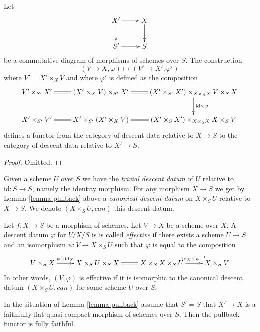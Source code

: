 \begin{lemma}
\label{lemma-pullback}
Let
$$
\xymatrix{
X' \ar[r] \ar[d] & X \ar[d] \\
S' \ar[r] & S
}
$$
be a commutative diagram of morphisms of schemes over $S$.
The construction
$$
(V \to X, \varphi) \longmapsto (V' \to X', \varphi')
$$
where $V' = X' \times_X V$ and where
$\varphi'$ is defined as the composition
$$
\xymatrix{
V' \times_{S'} X' \ar@{=}[r] &
(X' \times_X V) \times_{S'} X' \ar@{=}[r] &
(X' \times_{S'} X') \times_{X \times_S X} V \times_S X
\ar[d]^{\text{id} \times \varphi} \\
X' \times_{S'} V' \ar@{=}[r] &
X' \times_{S'} (X' \times_X V) &
(X' \times_S X') \times_{X \times_S X} X \times_S V \ar@{=}[l]
}
$$
defines a functor from the category of descent data
relative to $X \to S$ to the category of descent data
relative to $X' \to S$.
\end{lemma}

\begin{proof}
Omitted.
\end{proof}

\noindent
Given a scheme $U$ over $S$ we have the {\it trivial
descent datum} of $U$ relative to $\text{id} : S \to S$,
namely the identity morphism.
For any morphism $X \to S$ we get by Lemma \ref{lemma-pullback} above
a {\it canonical descent datum} on $X \times_S U$
relative to $X \to S$. We denote $(X \times_S U, can)$ this descent datum.

\begin{definition}
\label{definition-effective}
Let $f : X \to S$ be a morphism of schemes.
Let $V \to X$ be a scheme over $X$.
A descent datum $\varphi$ for $V/X/S$ is
is called {\it effective} if there exists a 
scheme $U \to S$ and an isomorphism $\psi : V \to X \times_S U$
such that $\varphi$ is equal to the composition
$$
\xymatrix{
V \times_S X \ar[r]^-{\psi \times \text{id}_X} &
X \times_S U \times_S X \ar@{=}[r] &
X \times_S X \times_S U 
\ar[r]^-{\text{id}_X \times \psi^{-1}} &
X \times_S V
}
$$
In other words, $(V, \varphi)$ is effective if it is
isomorphic to the canonical descent datum
$(X \times_S U, can)$ for some scheme $U$ over $S$.
\end{definition}

\begin{lemma}
\label{lemma-fully-faithful}
In the situation of Lemma \ref{lemma-pullback}
assume that $S' = S$ that $X' \to X$ is a faithfully flat quasi-compact
morphism of schemes over $S$. Then the pullback
functor is fully faithful.
\end{lemma}

